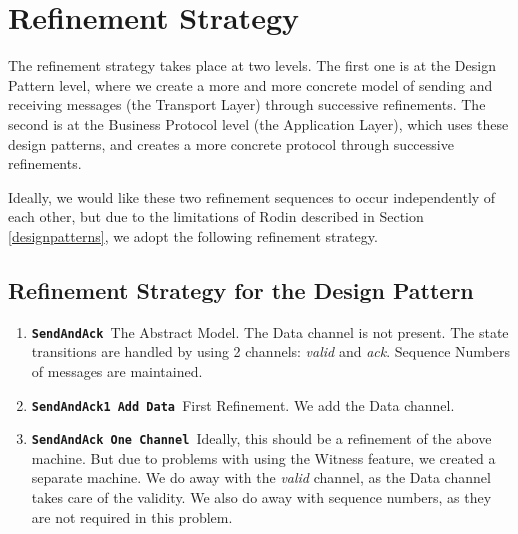 \section{Refinement Strategy}
The refinement strategy takes place at two levels. The first one is at the Design Pattern level, where we create a more and more concrete model of sending and receiving messages (the Transport Layer) through successive refinements. The second is at the Business Protocol level (the Application Layer), which uses these design patterns, and creates a more concrete protocol through successive refinements.

Ideally, we would like these two refinement sequences to occur independently of each other, but due to the limitations of Rodin described in Section \ref{designpatterns}, we adopt the following refinement strategy.

\subsection{Refinement Strategy for the Design Pattern}
\begin{enumerate}
\item \texttt{\bf SendAndAck }The Abstract Model. The Data channel is not present. The state transitions are handled by using 2 channels: \emph{valid} and \emph{ack}. Sequence Numbers of messages are maintained. 
\item \texttt{\bf SendAndAck1 Add Data }First Refinement. We add the Data channel.
\item \texttt{\bf SendAndAck One Channel }Ideally, this should be a refinement of the above machine. But due to problems with using the Witness feature, we created a separate machine. We do away with the \emph{valid} channel, as the Data channel takes care of the validity. We also do away with sequence numbers, as they are not required in this problem.
\end{enumerate}


